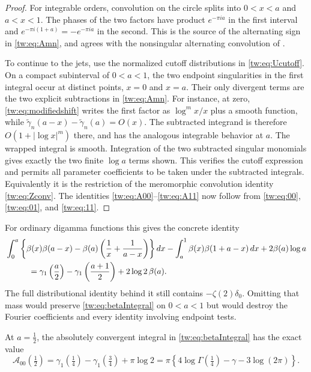 \begin{proof}
For integrable orders, convolution on the circle splits into
$0<x<a$ and $a<x<1$. The phases of the two factors have product
$e^{-\pi ia}$ in the first interval and
$e^{-\pi i(1+a)}=-e^{-\pi ia}$ in the second. This is the source
of the alternating sign in \eqref{tw:eq:Amn}, and agrees with
the nonsingular alternating convolution of
\cite[Theorem~1.13]{tw:ZhuHuKim}.

To continue to the jets, use the normalized cutoff distributions in
\eqref{tw:eq:Ucutoff}. On a compact subinterval of $0<a<1$, the
two endpoint singularities in the first integral occur at distinct
points, $x=0$ and $x=a$. Their only divergent terms are the two
explicit subtractions in \eqref{tw:eq:Amn}. For instance, at zero,
\eqref{tw:eq:modifiedshift} writes the first factor as
$\log^m x/x$ plus a smooth function, while
$\widetilde\gamma_n(a-x)-\widetilde\gamma_n(a)=O(x)$.
The subtracted integrand is therefore
$O(1+|\log x|^m)$ there, and has the analogous integrable behavior
at $a$. The wrapped integral is smooth. Integration of the two
subtracted singular monomials gives exactly the two finite
$\log a$ terms shown. This verifies the cutoff expression and
permits all parameter coefficients to be taken under the
subtracted integrals. Equivalently it is the restriction of the
meromorphic convolution identity \eqref{tw:eq:Zconv}. The identities
\eqref{tw:eq:A00}--\eqref{tw:eq:A11} now follow from
\eqref{tw:eq:00}, \eqref{tw:eq:01}, and \eqref{tw:eq:11}.
\end{proof}

For ordinary digamma functions this gives the concrete identity
\begin{align}
 &\int_0^a\left\{\beta(x)\beta(a-x)
               -\beta(a)\left(\frac1x+\frac1{a-x}\right)\right\}dx
       -\int_a^1\beta(x)\beta(1+a-x)\,dx
       +2\beta(a)\log a\notag\\
 &\hspace{1cm}=\gamma_1\left(\frac a2\right)
          -\gamma_1\left(\frac{a+1}{2}\right)
                         +2\log2\,\beta(a).
 \label{tw:eq:betaIntegral}
\end{align}
The full distributional identity behind it still contains
$-\zeta(2)\delta_0$. Omitting that mass would preserve
\eqref{tw:eq:betaIntegral} on $0<a<1$ but would destroy the
Fourier coefficients and every identity involving endpoint tests.

\begin{corollary}
\label{tw:cor:quarterGamma}
At $a=\tfrac12$, the absolutely convergent integral in
\eqref{tw:eq:betaIntegral} has the exact value
\begin{equation}\label{tw:eq:quarterGamma}
 \mathcal A_{00}\left(\tfrac12\right)
 =\gamma_1\left(\tfrac14\right)-\gamma_1\left(\tfrac34\right)
                                      +\pi\log2
 =\pi\left\{4\log\Gamma\left(\tfrac14\right)
                          -\gamma-3\log(2\pi)\right\}.
\end{equation}
\end{corollary}

